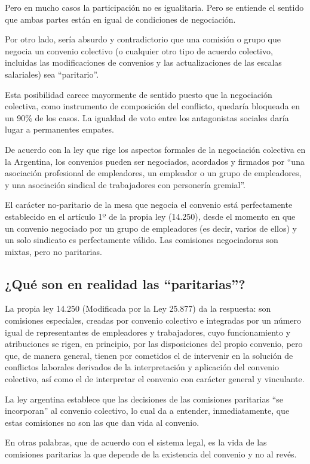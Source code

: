 \documentclass[a4paper, 12pt]{article}
\begin{document}
Pero en mucho casos la participación no es igualitaria. Pero se entiende el sentido que ambas partes están en igual de condiciones de negociación.

Por otro lado, sería absurdo y contradictorio que una comisión o grupo que negocia un convenio colectivo (o cualquier otro tipo de acuerdo colectivo, incluidas las modificaciones de convenios y las actualizaciones de las escalas salariales) sea ``paritario''.

Esta posibilidad carece mayormente de sentido puesto que la negociación colectiva, como instrumento de composición del conflicto, quedaría bloqueada en un 90\% de los casos. La igualdad de voto entre los antagonistas sociales daría lugar a permanentes empates.

De acuerdo con la ley que rige los aspectos formales de la negociación colectiva en la Argentina, los convenios pueden ser negociados, acordados y firmados por ``una asociación profesional de empleadores, un empleador o un grupo de empleadores, y una asociación sindical de trabajadores con personería gremial''.

El carácter no-paritario de la mesa que negocia el convenio está perfectamente establecido en el artículo 1º de la propia ley (14.250), desde el momento en que un convenio negociado por un grupo de empleadores (es decir, varios de ellos) y un solo sindicato es perfectamente válido. Las comisiones negociadoras son mixtas, pero no paritarias.

\subsection{¿Qué son en realidad las ``paritarias''?}
La propia ley 14.250 (Modificada por la  Ley 25.877) da la respuesta: son comisiones especiales, creadas por convenio colectivo e integradas por un número igual de representantes de empleadores y trabajadores, cuyo funcionamiento y atribuciones se rigen, en principio, por las disposiciones del propio convenio, pero que, de manera general, tienen por cometidos el de intervenir en la solución de conflictos laborales derivados de la interpretación y aplicación del convenio colectivo, así como el de interpretar el convenio con carácter general y vinculante.

La ley argentina establece que las decisiones de las comisiones paritarias ``se incorporan'' al convenio colectivo, lo cual da a entender, inmediatamente, que estas comisiones no son las que dan vida al convenio.

En otras palabras, que de acuerdo con el sistema legal, es la vida de las comisiones paritarias la que depende de la existencia del convenio y no al revés.
\end{document}
